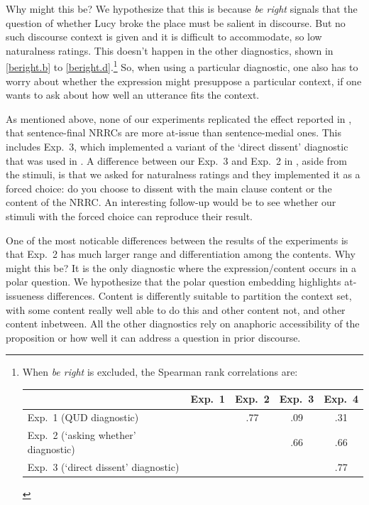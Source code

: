 \documentclass[times,linguex,xcolor]{glossa}
\begin{document}
Why might this be? We hypothesize that this is because \emph{be right} signals that the question of whether Lucy broke the place must be salient in discourse. But no such discourse context is given and it is difficult to accommodate, so low naturalness ratings. This doesn't happen in the other diagnostics, shown in \ref{beright.b} to \ref{beright.d}.\footnote{When \emph{be right} is excluded, the Spearman rank correlations are:
  
 \begin{tabular}{l | c c c c}
 & Exp.~1 & Exp.~2 & Exp.~3 & Exp.~4 \\ \hline
 Exp.~1 (QUD diagnostic) & \cellcolor{lightgray} & .77 & .09 & .31 \\
 Exp.~2 (`asking whether' diagnostic) & \cellcolor{lightgray} & \cellcolor{lightgray} & .66 & .66 \\
 Exp.~3 (`direct dissent' diagnostic) & \cellcolor{lightgray}& \cellcolor{lightgray} & \cellcolor{lightgray} & .77  \\
 \hline
 \end{tabular}} So, when using a particular diagnostic, one also has to worry about whether the expression might presuppose a particular context, if one wants to ask about how well an utterance fits the context.
 
 As mentioned above, none of our experiments replicated the effect reported in \citealt{syrett_experimental_2015}, that sentence-final NRRCs are more at-issue than sentence-medial ones. This includes Exp.~3, which implemented a variant of the `direct dissent' diagnostic that was used in \citealt{syrett_experimental_2015}. A difference between our Exp.~3 and Exp.~2 in \citealt{syrett_experimental_2015}, aside from the stimuli, is that we asked for naturalness ratings and they implemented it as a forced choice: do you choose to dissent with the main clause content or the content of the NRRC. An interesting follow-up would be to see whether our stimuli with the forced choice can reproduce their result.
 
 One of the most noticable differences between the results of the experiments is that Exp.~2 has much larger range and differentiation among the contents. Why might this be? It is the only diagnostic where the expression/content occurs in a polar question. We hypothesize that the polar question embedding highlights at-issueness differences. Content is differently suitable to partition the context set, with some content really well able to do this and other content not, and other content inbetween. All the other diagnostics rely on anaphoric accessibility of the proposition or how well it can address a question in prior discourse. 
 
\end{document}
